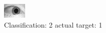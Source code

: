 \begin{figure}[h!]
\begin{center}
\includegraphics[width=0.60\columnwidth]{figures/ID1522_class_2_target_1.png}
\end{center}
\caption{ Classification: 2 actual target: 1}
\label{fig:ID1522_class_2_target_1}
\end{figure}
